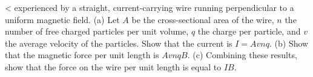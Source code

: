 <%
experienced by a straight, current-carrying wire running
perpendicular to a uniform magnetic field. (a) Let $A$ be
the cross-sectional area of the wire, $n$ the number of free
charged particles per unit volume, $q$ the charge per
particle, and $v$ the average velocity of the particles.
Show that the current is $I=Avnq$. (b) Show that the
magnetic force per unit length is $AvnqB$. (c)
Combining these results, show that the force on the wire per
unit length is equal to $IB$.
